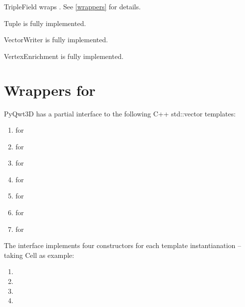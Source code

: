 \documentclass{manual}
\newcommand{\Future}{
  \begin{notice}[warning]
    The documentation is for the future PyQwt3D-0.1.6 which has not yet been
    released.  Please refer, to the documentation in the release that you are
    using.
  \end{notice}
}
\renewcommand{\Future}{}
\begin{document}
\begin{classdesc*}{TripleField}
wraps . See \ref{wrappers} for details.
\end{classdesc*}

\begin{classdesc*}{Tuple}
is fully implemented.
\end{classdesc*}

\begin{classdesc*}{VectorWriter}
is fully implemented.
\end{classdesc*}

\begin{classdesc*}{VertexEnrichment}
is fully implemented.
\end{classdesc*}

\section{Wrappers for  \label{wrappers}}

\Future{}

PyQwt3D has a partial interface to the following C++ std::vector templates:
\begin{enumerate}
\item
   for 
\item
   for 
\item
   for 
\item
   for 
\item
   for 
\item
   for 
\item
   for 
\end{enumerate}

The interface implements four constructors for each template instantianation --
taking Cell as example:
\begin{enumerate}
\item
\item
\item
\item
\end{enumerate}
\end{document}
